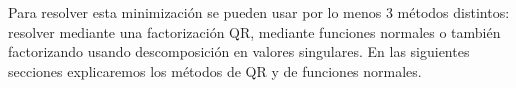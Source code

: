 Para resolver esta minimización se pueden usar por lo menos 3 métodos distintos: resolver mediante una factorización QR, mediante funciones normales o también factorizando usando descomposición en valores singulares. En las siguientes secciones explicaremos los métodos de QR y de funciones normales.


%
%
